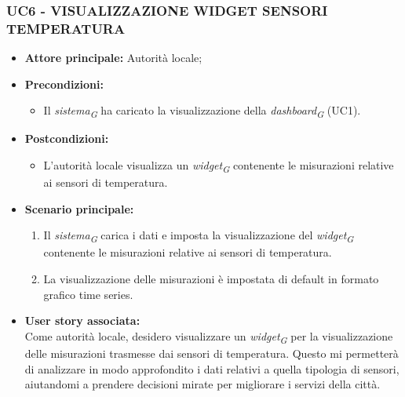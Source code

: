 \subsubsection{UC6 - VISUALIZZAZIONE WIDGET SENSORI TEMPERATURA}
\begin{itemize}
    \item \textbf{Attore principale:} Autorità locale;
    \item \textbf{Precondizioni:}
        \begin{itemize}
            \item Il \textit{sistema}\textsubscript{\textit{G}} ha caricato la visualizzazione della \textit{dashboard}\textsubscript{\textit{G}} (UC1).
        \end{itemize}
    \item \textbf{Postcondizioni:}
        \begin{itemize}
            \item L'autorità locale visualizza un \textit{widget}\textsubscript{\textit{G}} contenente le misurazioni relative ai sensori di temperatura.
        \end{itemize}
        \item \textbf{Scenario principale:}
        \begin{enumerate}
            \item Il \textit{sistema}\textsubscript{\textit{G}} carica i dati e imposta la visualizzazione del \textit{widget}\textsubscript{\textit{G}} contenente le misurazioni relative ai sensori di temperatura.
            \item La visualizzazione delle misurazioni è impostata di default in formato grafico time series.
        \end{enumerate}
    \item \textbf{User story associata:} \\
        Come autorità locale, desidero visualizzare un \textit{widget}\textsubscript{\textit{G}} per la visualizzazione delle misurazioni trasmesse dai sensori di temperatura. Questo mi permetterà di analizzare in modo approfondito i dati relativi a quella tipologia di sensori, aiutandomi a prendere decisioni mirate per migliorare i servizi della città.
\end{itemize}
